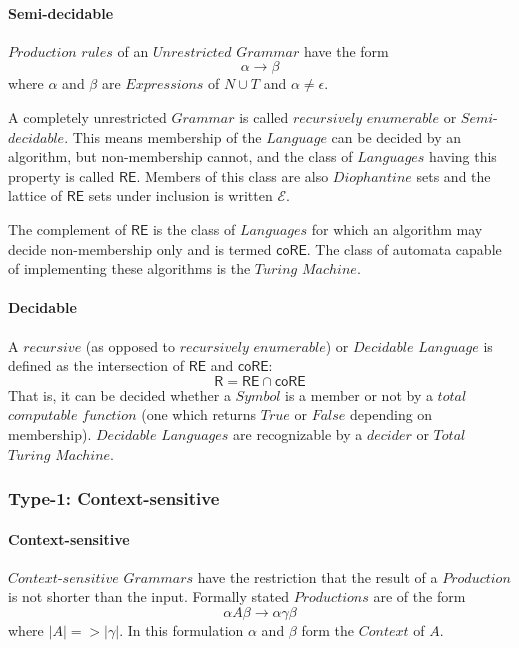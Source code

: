 \documentclass{article}
\begin{document}
\paragraph{Semi-decidable}
$Production$ $rules$ of an $Unrestricted$ $Grammar$ have the form
\[
    \alpha \rightarrow \beta
\]
where $\alpha$ and $\beta$ are $Expressions$ of $N \cup T$ and $\alpha
\neq \epsilon$.

A completely unrestricted $Grammar$ is called $recursively$
$enumerable$ or $Semi$-$decidable$. This means membership of the
$Language$ can be decided by an algorithm, but non-membership cannot,
and the class of $Languages$ having this property is called
$\mathsf{RE}$. Members of this class are also $Diophantine$ sets and
the lattice of $\mathsf{RE}$ sets under inclusion is written
$\mathcal{E}$.

The complement of $\mathsf{RE}$ is the class of $Languages$ for which
an algorithm may decide non-membership only and is termed
$\mathsf{coRE}$. The class of automata capable of implementing these
algorithms is the $Turing$ $Machine$.

\paragraph{Decidable}
A $recursive$ (as opposed to $recursively$ $enumerable$) or
$Decidable$ $Language$ is defined as the intersection of $\mathsf{RE}$
and $\mathsf{coRE}$:
\[
    \mathsf{R} = \mathsf{RE} \cap \mathsf{coRE}
\]
That is, it can be decided whether a $Symbol$ is a member or not by a
$total$ $computable$ $function$ (one which returns $True$ or $False$
depending on membership). $Decidable$ $Languages$ are recognizable by
a $decider$ or $Total$ $Turing$ $Machine$.

\subsubsection{Type-1: Context-sensitive}

\paragraph{Context-sensitive}
$Context$-$sensitive$ $Grammars$ have the restriction that the result
of a $Production$ is not shorter than the input. Formally stated
$Productions$ are of the form
\[
    \alpha A \beta \rightarrow \alpha \gamma \beta
\]
where $|A| => |\gamma|$. In this formulation $\alpha$ and $\beta$ form
the $Context$ of $A$.
\end{document}
